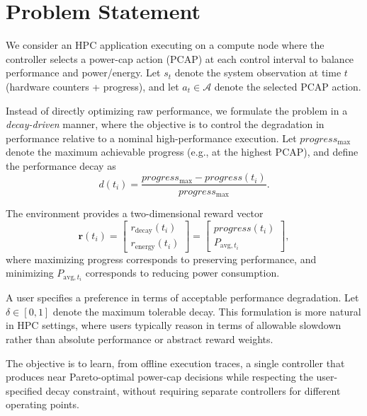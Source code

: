 \section{Problem Statement}\label{ch5:sec:Problem}

We consider an HPC application executing on a compute node where the controller selects a power-cap action (PCAP) at each control interval to balance performance and power/energy. Let $s_t$ denote the system observation at time $t$ (hardware counters + progress), and let $a_t \in \mathcal{A}$ denote the selected PCAP action.

Instead of directly optimizing raw performance, we formulate the problem in a \textit{decay-driven} manner, where the objective is to control the degradation in performance relative to a nominal high-performance execution. Let $progress_{\max}$ denote the maximum achievable progress (e.g., at the highest PCAP), and define the performance decay as
\begin{equation}
\label{eq:decay}
d(t_i) = \frac{progress_{\max} - progress(t_i)}{progress_{\max}}.
\end{equation}

The environment provides a two-dimensional reward vector
\begin{equation}
\label{eq:reward_vector}
\mathbf{r}(t_i) =
\left[
\begin{array}{c}
r_{\text{decay}}(t_i) \\
r_{\text{energy}}(t_i)
\end{array}
\right]
=
\left[
\begin{array}{c}
progress(t_i) \\
P_{\text{avg},t_i}
\end{array}
\right],
\end{equation}
where maximizing progress corresponds to preserving performance, and minimizing $P_{\text{avg},t_i}$ corresponds to reducing power consumption.

A user specifies a preference in terms of acceptable performance degradation. Let $\delta \in [0,1]$ denote the maximum tolerable decay. This formulation is more natural in HPC settings, where users typically reason in terms of allowable slowdown rather than absolute performance or abstract reward weights.

The objective is to learn, from offline execution traces, a single controller that produces near Pareto-optimal power-cap decisions while respecting the user-specified decay constraint, without requiring separate controllers for different operating points.

